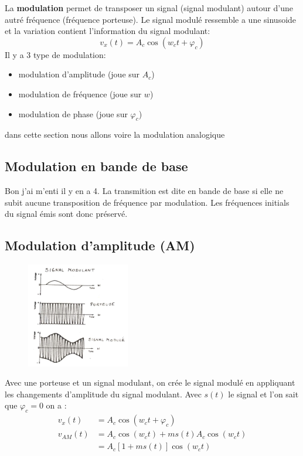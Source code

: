 \documentclass[12pt]{article}
\begin{document}
	La \textbf{modulation} permet de transposer un signal (signal modulant) autour d'une autré fréquence (fréquence porteuse). Le signal modulé ressemble a une sinusoide et la variation contient l'information du signal modulant:
	\begin{equation}
		v_x(t) = A_c \cos(w_ct + \varphi_c)
	\end{equation}
	Il y a 3 type de modulation:
	\begin{itemize}
		\item modulation d'amplitude (joue sur $A_c$)
		\item modulation de fréquence (joue sur $w$)
		\item modulation de phase (joue sur $\varphi_c$)
	\end{itemize}
	
	dans cette section nous allons voire la modulation analogique
	
	\subsection{Modulation en bande de base}
		Bon j'ai m'enti il y en a 4.
		La transmition est dite en bande de base si elle ne subit aucune transposition de fréquence par modulation. Les fréquences initials du signal émis sont donc préservé.
	\subsection{Modulation d'amplitude (AM)}
		
		\begin{figure}[htp]
			\centering
			\includegraphics[width=0.4\textwidth]{img/modulationAM.png}
		\end{figure}
		
		Avec une porteuse et un signal modulant, on crée le signal modulé en appliquant les changements d'amplitude du signal modulant. Avec $s(t)$ le signal et l'on sait que $\varphi_c = 0$ on a :
		\begin{equation} \label{eq1}
			\begin{split}
		v_x(t) &= A_c \cos(w_ct + \varphi_c) \\
		v_{AM}(t) &= A_c \cos(w_ct) + ms(t) A_c \cos(w_c t) \\
		& = A_c[1+ms(t)]\cos(w_c t)
			\end{split}
		\end{equation}
		
\end{document}
